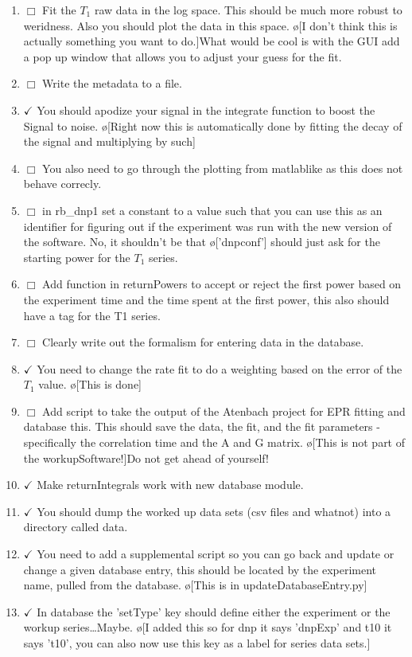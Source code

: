 \documentclass[10pt]{book}
\begin{document}
\begin{enumerate}
    \item $\Box$ Fit the $T_1$ raw data in the log space. This should be much more robust to weridness. Also you should plot the data in this space. \o[I don't think this is actually something you want to do.]{What would be cool is with the GUI add a pop up window that allows you to adjust your guess for the fit.}
    \item $\Box$ Write the metadata to a file.
    \item $\checkmark$ You should apodize your signal in the integrate function to boost the Signal to noise. \o[Right now this is automatically done by fitting the decay of the signal and multiplying by such]{}
    \item $\Box$ You also need to go through the plotting from matlablike as this does not behave correcly.
    \item $\Box$ in rb_dnp1 set a constant to a value such that you can use this as an identifier for figuring out if the experiment was run with the new version of the software. No, it shouldn't be that \o['dnpconf']{} should just ask for the starting power for the $T_1$ series.
    \item $\Box$ Add function in returnPowers to accept or reject the first power based on the experiment time and the time spent at the first power, this also should have a tag for the T1 series.
    \item $\Box$ Clearly write out the formalism for entering data in the database.
    \item $\checkmark$ You need to change the rate fit to do a weighting based on the error of the $T_1$ value. \o[This is done]{}
    \item $\Box$ Add script to take the output of the Atenbach project for EPR fitting and database this. This should save the data, the fit, and the fit parameters - specifically the correlation time and the A and G matrix. \o[This is not part of the workupSoftware!]{Do not get ahead of yourself!}
    \item $\checkmark$ Make returnIntegrals work with new database module.
    \item $\checkmark$ You should dump the worked up data sets (csv files and whatnot) into a directory called data.
    \item $\checkmark$ You need to add a supplemental script so you can go back and update or change a given database entry, this should be located by the experiment name, pulled from the database. \o[This is in updateDatabaseEntry.py]{}
    \item $\checkmark$ In database the 'setType' key should define either the experiment or the workup series\ldots Maybe. \o[I added this so for dnp it says 'dnpExp' and t10 it says 't10', you can also now use this key as a label for series data sets.]{}

\end{enumerate}
\end{document}
